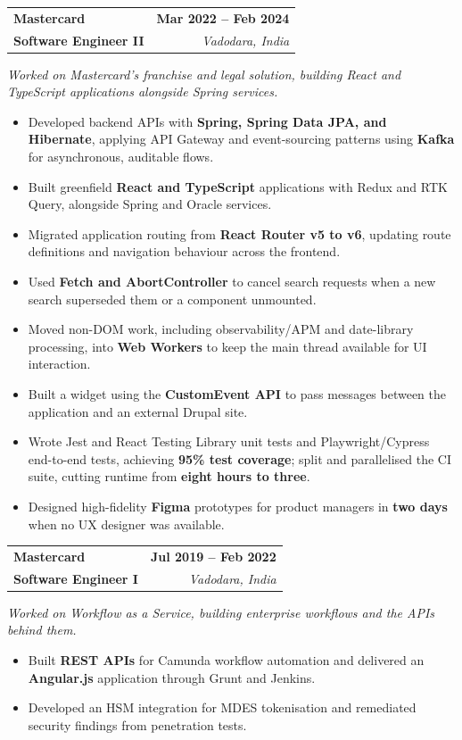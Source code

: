 \documentclass[letterpaper,10pt]{article}
\makeatletter
\newcommand{\resumeRole}[4]{%
  \noindent\begin{tabular*}{\textwidth}{@{}l@{\extracolsep{\fill}}r@{}}
    \textbf{#1} & \textbf{#2}\\[1pt]
    \textbf{#3} & \textit{#4}\\[3pt]
  \end{tabular*}\vspace{-2pt}
}
\newenvironment{resumeBullets}{%
  \begin{itemize}[leftmargin=0.19in,label=\textbullet,itemsep=0.2pt,topsep=0.8pt,parsep=0pt,partopsep=0pt]
}{%
  \end{itemize}\vspace{1pt}
}
\newcommand{\resumeContext}[1]{\noindent\textit{#1}\par\vspace{1pt}}
\makeatother
\begin{document}
\resumeRole{Mastercard}{Mar 2022 -- Feb 2024}{Software Engineer II}{Vadodara, India}
\resumeContext{Worked on Mastercard's franchise and legal solution, building React and TypeScript applications alongside Spring services.}
\begin{resumeBullets}
    \item Developed backend APIs with \textbf{Spring, Spring Data JPA, and Hibernate}, applying API Gateway and event-sourcing patterns using \textbf{Kafka} for asynchronous, auditable flows.
  \item Built greenfield \textbf{React and TypeScript} applications with Redux and RTK Query, alongside Spring and Oracle services.
  \item Migrated application routing from \textbf{React Router v5 to v6}, updating route definitions and navigation behaviour across the frontend.
  \item Used \textbf{Fetch and AbortController} to cancel search requests when a new search superseded them or a component unmounted.
  \item Moved non-DOM work, including observability/APM and date-library processing, into \textbf{Web Workers} to keep the main thread available for UI interaction.
  \item Built a widget using the \textbf{CustomEvent API} to pass messages between the application and an external Drupal site.
  \item Wrote Jest and React Testing Library unit tests and Playwright/Cypress end-to-end tests, achieving \textbf{95\% test coverage}; split and parallelised the CI suite, cutting runtime from \textbf{eight hours to three}.
  \item Designed high-fidelity \textbf{Figma} prototypes for product managers in \textbf{two days} when no UX designer was available.
\end{resumeBullets}

\resumeRole{Mastercard}{Jul 2019 -- Feb 2022}{Software Engineer I}{Vadodara, India}

\resumeContext{Worked on Workflow as a Service, building enterprise workflows and the APIs behind them.}
\begin{resumeBullets}
  \item Built \textbf{REST APIs} for Camunda workflow automation and delivered an \textbf{Angular.js} application through Grunt and Jenkins.
  \item Developed an HSM integration for MDES tokenisation and remediated security findings from penetration tests.
\end{resumeBullets}
\end{document}
